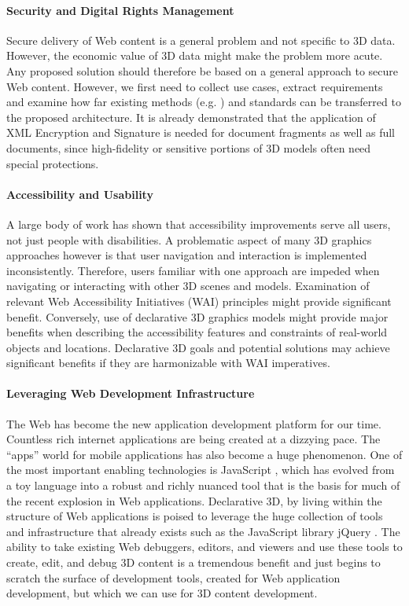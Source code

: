 \documentclass[review]{acmsiggraph}
\begin{document}
\paragraph{Security and Digital Rights Management}
Secure delivery of Web content is a general problem and not specific to 3D data. However, the economic value of 3D data might make the problem more acute. Any proposed solution should therefore be based on a general approach to secure Web content. However, we first need to collect use cases, extract requirements and examine how far existing methods (e.g. \cite{KollerL05}) and standards can be transferred to the proposed architecture. It is already demonstrated that the application of XML Encryption and Signature is needed for document fragments as well as full documents, since high-fidelity or sensitive portions of 3D models often need special protections.

\paragraph{Accessibility and Usability}
A large body of work has shown that accessibility improvements serve all users, not just people with disabilities. A problematic aspect of many 3D graphics approaches however is that user navigation and interaction is implemented inconsistently. Therefore, users familiar with one approach are impeded when navigating or interacting with other 3D scenes and models. Examination of relevant Web Accessibility Initiatives (WAI) principles might provide significant benefit. Conversely, use of declarative 3D graphics models might provide major benefits when describing the accessibility features and constraints of real-world objects and locations. Declarative 3D goals and potential solutions may achieve significant benefits if they are harmonizable with WAI imperatives.

\paragraph{Leveraging Web Development Infrastructure}
The Web has become the new application development platform for our time. Countless rich internet applications are being created at a dizzying pace. The ``apps'' world for mobile applications has also become a huge phenomenon. One of the most important enabling technologies is JavaScript \cite{Crockford08}, which has evolved from a toy language into a robust and richly nuanced tool that is the basis for much of the recent explosion in Web applications.
Declarative 3D, by living within the structure of Web applications is poised to leverage the huge collection of tools and infrastructure that already exists such as the JavaScript library jQuery \cite{jquery}. The ability to take existing Web debuggers, editors, and viewers and use these tools to create, edit, and debug 3D content is a tremendous benefit and just begins to scratch the surface of development tools, created for Web application development, but which we can use for 3D content development.
\end{document}
